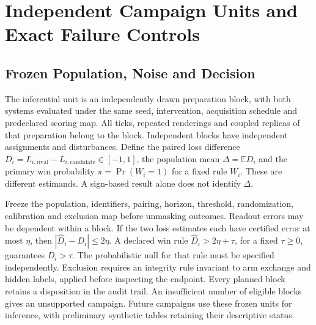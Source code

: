 \documentclass[11pt,a4paper]{article}
\theoremstyle{definition}
\begin{document}
\section{Independent Campaign Units and Exact Failure Controls}

\subsection{Frozen Population, Noise and Decision}

The inferential unit is an independently drawn preparation block, with both systems evaluated under the same seed, intervention, acquisition schedule and predeclared scoring map. All ticks, repeated renderings and coupled replicas of that preparation belong to the block. Independent blocks have independent assignments and disturbances. Define the paired loss difference $D_i=L_{i,\mathrm{rival}}-L_{i,\mathrm{candidate}}\in[-1,1]$, the population mean $\Delta=\mathbb E D_i$ and the primary win probability $\pi=\Pr(W_i=1)$ for a fixed rule $W_i$. These are different estimands. A sign-based result alone does not identify $\Delta$.

Freeze the population, identifiers, pairing, horizon, threshold, randomization, calibration and exclusion map before unmasking outcomes. Readout errors may be dependent within a block. If the two loss estimates each have certified error at most $\eta$, then $|\widehat D_i-D_i|\le2\eta$. A declared win rule $\widehat D_i>2\eta+\tau$, for a fixed $\tau\ge0$, guarantees $D_i>\tau$. The probabilistic null for that rule must be specified independently. Exclusion requires an integrity rule invariant to arm exchange and hidden labels, applied before inspecting the endpoint. Every planned block retains a disposition in the audit trail. An insufficient number of eligible blocks gives an unsupported campaign. Future campaigns use these frozen units for inference, with preliminary synthetic tables retaining their descriptive status.
\end{document}
